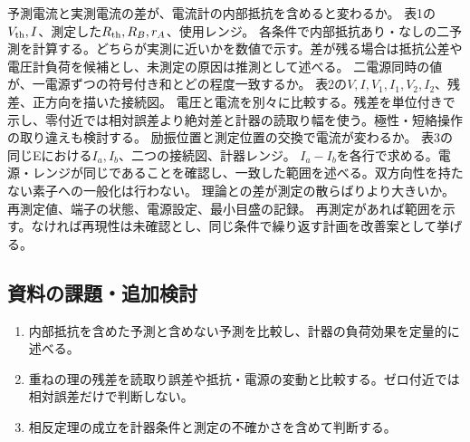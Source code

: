 \documentclass[lualatex,a4paper,10pt]{jlreq}
\begin{document}
{予測電流と実測電流の差が、電流計の内部抵抗を含めると変わるか。}
{表1の$V_{\rm th},I$、測定した$R_{\rm th},R_B,r_A$、使用レンジ。}
{各条件で内部抵抗あり・なしの二予測を計算する。どちらが実測に近いかを数値で示す。差が残る場合は抵抗公差や電圧計負荷を候補とし、未測定の原因は推測として述べる。}
{二電源同時の値が、一電源ずつの符号付き和とどの程度一致するか。}
{表2の$V,I,V_1,I_1,V_2,I_2$、残差、正方向を描いた接続図。}
{電圧と電流を別々に比較する。残差を単位付きで示し、零付近では相対誤差より絶対差と計器の読取り幅を使う。極性・短絡操作の取り違えも検討する。}
{励振位置と測定位置の交換で電流が変わるか。}
{表3の同じEにおける$I_a,I_b$、二つの接続図、計器レンジ。}
{$I_a-I_b$を各行で求める。電源・レンジが同じであることを確認し、一致した範囲を述べる。双方向性を持たない素子への一般化は行わない。}
{理論との差が測定の散らばりより大きいか。}
{再測定値、端子の状態、電源設定、最小目盛の記録。}
{再測定があれば範囲を示す。なければ再現性は未確認とし、同じ条件で繰り返す計画を改善案として挙げる。}
\subsection{資料の課題・追加検討}
\begin{enumerate}
\item 内部抵抗を含めた予測と含めない予測を比較し、計器の負荷効果を定量的に述べる。
\item 重ねの理の残差を読取り誤差や抵抗・電源の変動と比較する。ゼロ付近では相対誤差だけで判断しない。
\item 相反定理の成立を計器条件と測定の不確かさを含めて判断する。
\end{enumerate}
\writing{12mm}
\end{document}
